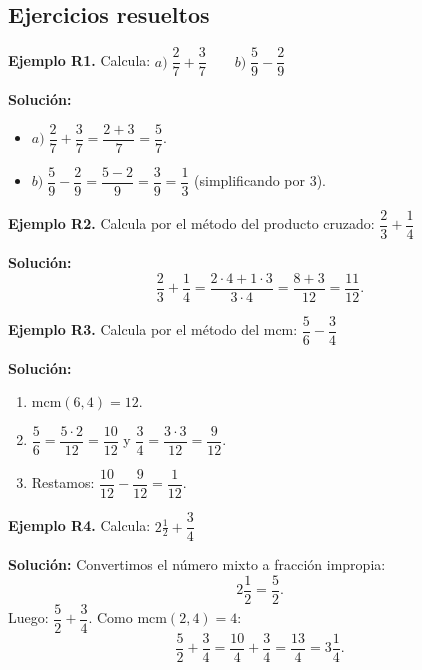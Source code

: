 \documentclass[12pt, letterpaper]{article}
\begin{document}
\newpage %

\subsection{Ejercicios resueltos}

\textbf{Ejemplo R1.} Calcula: $a) \; \dfrac{2}{7} + \dfrac{3}{7} \qquad b) \; \dfrac{5}{9} - \dfrac{2}{9}$

\begin{cuadrosolucion}
  \textbf{Solución:}
  \begin{itemize}
    \item $a) \; \dfrac{2}{7} + \dfrac{3}{7} = \dfrac{2 + 3}{7} = \dfrac{5}{7}$.
    \item $b) \; \dfrac{5}{9} - \dfrac{2}{9} = \dfrac{5 - 2}{9} = \dfrac{3}{9} = \dfrac{1}{3}$ (simplificando por 3).
  \end{itemize}
\end{cuadrosolucion}

\textbf{Ejemplo R2.} Calcula por el método del producto cruzado: $\dfrac{2}{3} + \dfrac{1}{4}$

\begin{cuadrosolucion}
  \textbf{Solución:}
  $$\frac{2}{3} + \frac{1}{4} = \frac{2 \cdot 4 + 1 \cdot 3}{3 \cdot 4} = \frac{8 + 3}{12} = \frac{11}{12}.$$
\end{cuadrosolucion}

\textbf{Ejemplo R3.} Calcula por el método del mcm: $\dfrac{5}{6} - \dfrac{3}{4}$

\begin{cuadrosolucion}
  \textbf{Solución:}
  \begin{enumerate}
    \item mcm$(6, 4) = 12$.
    \item $\dfrac{5}{6} = \dfrac{5 \cdot 2}{12} = \dfrac{10}{12}$ \quad y \quad $\dfrac{3}{4} = \dfrac{3 \cdot 3}{12} = \dfrac{9}{12}$.
    \item Restamos: $\dfrac{10}{12} - \dfrac{9}{12} = \dfrac{1}{12}$.
  \end{enumerate}
\end{cuadrosolucion}

\textbf{Ejemplo R4.} Calcula: $2\frac{1}{2} + \dfrac{3}{4}$

\begin{cuadrosolucion}
  \textbf{Solución:} Convertimos el número mixto a fracción impropia:
  $$2\frac{1}{2} = \frac{5}{2}.$$
  Luego: $\dfrac{5}{2} + \dfrac{3}{4}$. Como mcm$(2,4) = 4$:
  $$\frac{5}{2} + \frac{3}{4} = \frac{10}{4} + \frac{3}{4} = \frac{13}{4} = 3\frac{1}{4}.$$
\end{cuadrosolucion}
\end{document}
